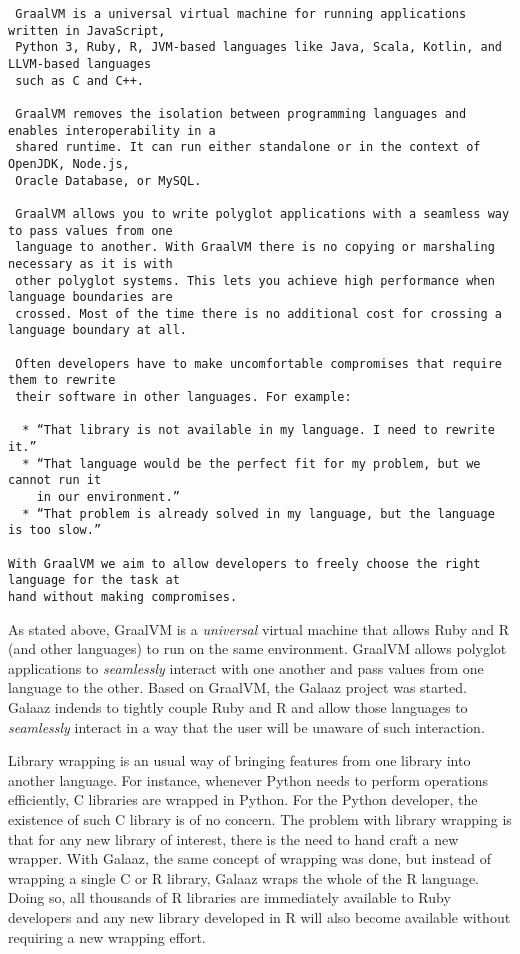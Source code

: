 \documentclass[]{article}
\begin{document}
\begin{verbatim}
 GraalVM is a universal virtual machine for running applications written in JavaScript,
 Python 3, Ruby, R, JVM-based languages like Java, Scala, Kotlin, and LLVM-based languages
 such as C and C++.

 GraalVM removes the isolation between programming languages and enables interoperability in a
 shared runtime. It can run either standalone or in the context of OpenJDK, Node.js,
 Oracle Database, or MySQL.

 GraalVM allows you to write polyglot applications with a seamless way to pass values from one
 language to another. With GraalVM there is no copying or marshaling necessary as it is with
 other polyglot systems. This lets you achieve high performance when language boundaries are
 crossed. Most of the time there is no additional cost for crossing a language boundary at all.

 Often developers have to make uncomfortable compromises that require them to rewrite
 their software in other languages. For example:

  * “That library is not available in my language. I need to rewrite it.” 
  * “That language would be the perfect fit for my problem, but we cannot run it
    in our environment.” 
  * “That problem is already solved in my language, but the language is too slow.”

With GraalVM we aim to allow developers to freely choose the right language for the task at
hand without making compromises.
\end{verbatim}

As stated above, GraalVM is a \emph{universal} virtual machine that
allows Ruby and R (and other languages) to run on the same environment.
GraalVM allows polyglot applications to \emph{seamlessly} interact with
one another and pass values from one language to the other. Based on
GraalVM, the Galaaz project was started. Galaaz indends to tightly
couple Ruby and R and allow those languages to \emph{seamlessly}
interact in a way that the user will be unaware of such interaction.

Library wrapping is an usual way of bringing features from one library
into another language. For instance, whenever Python needs to perform
operations efficiently, C libraries are wrapped in Python. For the
Python developer, the existence of such C library is of no concern. The
problem with library wrapping is that for any new library of interest,
there is the need to hand craft a new wrapper. With Galaaz, the same
concept of wrapping was done, but instead of wrapping a single C or R
library, Galaaz wraps the whole of the R language. Doing so, all
thousands of R libraries are immediately available to Ruby developers
and any new library developed in R will also become available without
requiring a new wrapping effort.
\end{document}
